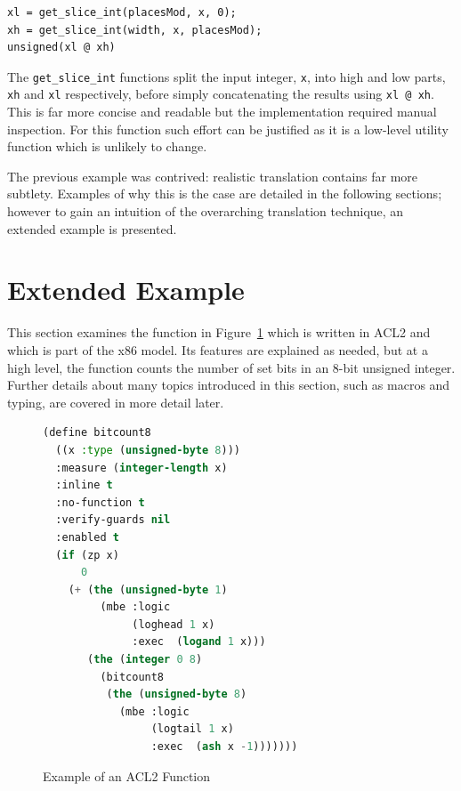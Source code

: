 \documentclass[a4paper,12pt,twoside,openright]{report}
\begin{document}
\begin{minipage}{\linewidth}
\begin{lstlisting}[language=sail]
xl = get_slice_int(placesMod, x, 0);
xh = get_slice_int(width, x, placesMod);
unsigned(xl @ xh)
\end{lstlisting}
\end{minipage}

The \texttt{get\_slice\_int} functions split the input integer, \texttt{x}, into high and low parts, \texttt{xh} and \texttt{xl} respectively, before simply concatenating the results using \texttt{xl @ xh}.  This is far more concise and readable but the implementation required manual inspection.  For this function such effort can be justified as it is a low-level utility function which is unlikely to change.

The previous example was contrived: realistic translation contains far more subtlety.  Examples of why this is the case are detailed in the following sections; however to gain an intuition of the overarching translation technique, an extended example is presented.

\hypertarget{extended-example}{
\section{Extended Example}\label{extended-example}}

This section examines the function in Figure~\ref{bitcount8} which is written in ACL2 and which is part of the x86 model.  Its features are explained as needed, but at a high level, the function counts the number of set bits in an 8-bit unsigned integer.  Further details about many topics introduced in this section, such as macros and typing, are covered in more detail later.

\begin{figure}
\begin{lstlisting}[language=lisp]
(define bitcount8
  ((x :type (unsigned-byte 8)))
  :measure (integer-length x)
  :inline t
  :no-function t
  :verify-guards nil
  :enabled t
  (if (zp x)
      0
    (+ (the (unsigned-byte 1)
         (mbe :logic
              (loghead 1 x)
              :exec  (logand 1 x)))
       (the (integer 0 8)
         (bitcount8
          (the (unsigned-byte 8)
            (mbe :logic
                 (logtail 1 x)
                 :exec  (ash x -1)))))))
\end{lstlisting}
\caption{Example of an ACL2 Function}
\label{bitcount8}
\end{figure}
\end{document}
